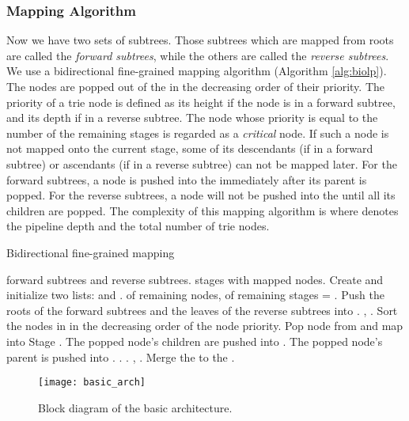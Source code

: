 \documentclass{sigcomm-alternate}
\begin{document}
\subsubsection{Mapping Algorithm}

Now we have two sets of subtrees. Those subtrees which are mapped from roots are called the \textit{forward subtrees}, while the others are called the \textit{reverse subtrees}. We use a bidirectional fine-grained mapping algorithm (Algorithm \ref{alg:biolp}). The nodes are popped out of the  in the decreasing order of their priority. The priority of a trie node is defined as its height if the node is in a forward subtree, and its depth if in a reverse subtree. The node whose priority is equal to the number of the remaining stages is regarded as a \textit{critical} node. If such a node is not mapped onto the current stage, some of its descendants (if in a forward subtree) or ascendants (if in a reverse subtree) can not be mapped later. For the forward subtrees, a node is pushed into the  immediately after its parent is popped. For the reverse subtrees, a node will not be pushed into the  until all its children are popped. The complexity of this mapping algorithm is  where  denotes the pipeline depth and  the total number of trie nodes.


\begin{algorithm}[htb]
\caption{Bidirectional fine-grained mapping}
\label{alg:biolp}
\begin{algorithmic}[1]
\REQUIRE  forward subtrees and  reverse subtrees.
\ENSURE  stages with mapped nodes.
\STATE Create and initialize two lists:  and .
\STATE  of remaining nodes,  of remaining stages = .
\STATE Push the roots of the forward subtrees and the leaves of the reverse subtrees into .
\STATE , .
\STATE Sort the nodes in  in the decreasing order of the node priority.
\STATE Pop node from  and map into Stage . 
\STATE The popped node's children are pushed into .
\STATE The popped node's parent is pushed into .
\ENDIF
\STATE .
\STATE .
\ENDIF
\ENDWHILE
\STATE , .
\STATE Merge the  to the .
\ENDFOR
\end{algorithmic}
\end{algorithm}

\begin{figure*}[bht]
\centering
\texttt{[image: basic\_arch]}
\caption{Block diagram of the basic architecture.}
\label{fig:basic_arch}
\end{figure*}
\end{document}

